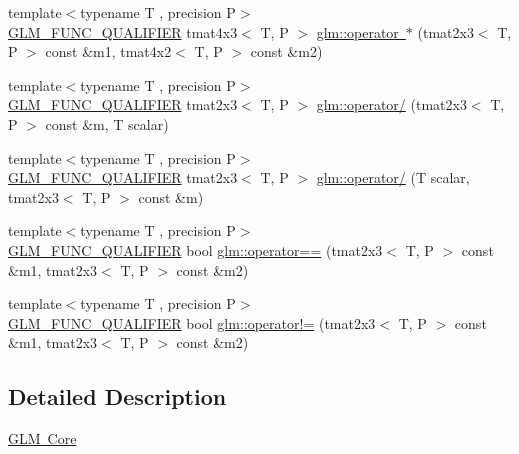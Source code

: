 \begin{DoxyCompactItemize}
\item 
{\footnotesize template$<$typename T , precision P$>$ }\\\mbox{\hyperlink{setup_8hpp_a33fdea6f91c5f834105f7415e2a64407}{G\+L\+M\+\_\+\+F\+U\+N\+C\+\_\+\+Q\+U\+A\+L\+I\+F\+I\+ER}} tmat4x3$<$ T, P $>$ \mbox{\hyperlink{namespaceglm_aaf7d0f92d8468f47eb9362cda2b3ee4c}{glm\+::operator $\ast$}} (tmat2x3$<$ T, P $>$ const \&m1, tmat4x2$<$ T, P $>$ const \&m2)
\item 
{\footnotesize template$<$typename T , precision P$>$ }\\\mbox{\hyperlink{setup_8hpp_a33fdea6f91c5f834105f7415e2a64407}{G\+L\+M\+\_\+\+F\+U\+N\+C\+\_\+\+Q\+U\+A\+L\+I\+F\+I\+ER}} tmat2x3$<$ T, P $>$ \mbox{\hyperlink{namespaceglm_ad78a0fb46bc094b31d0ee144a9316830}{glm\+::operator/}} (tmat2x3$<$ T, P $>$ const \&m, T scalar)
\item 
{\footnotesize template$<$typename T , precision P$>$ }\\\mbox{\hyperlink{setup_8hpp_a33fdea6f91c5f834105f7415e2a64407}{G\+L\+M\+\_\+\+F\+U\+N\+C\+\_\+\+Q\+U\+A\+L\+I\+F\+I\+ER}} tmat2x3$<$ T, P $>$ \mbox{\hyperlink{namespaceglm_ae913d17dd2dd1f90234509c4384a7790}{glm\+::operator/}} (T scalar, tmat2x3$<$ T, P $>$ const \&m)
\item 
{\footnotesize template$<$typename T , precision P$>$ }\\\mbox{\hyperlink{setup_8hpp_a33fdea6f91c5f834105f7415e2a64407}{G\+L\+M\+\_\+\+F\+U\+N\+C\+\_\+\+Q\+U\+A\+L\+I\+F\+I\+ER}} bool \mbox{\hyperlink{namespaceglm_ac912517a461de497022d75ec4de3dba5}{glm\+::operator==}} (tmat2x3$<$ T, P $>$ const \&m1, tmat2x3$<$ T, P $>$ const \&m2)
\item 
{\footnotesize template$<$typename T , precision P$>$ }\\\mbox{\hyperlink{setup_8hpp_a33fdea6f91c5f834105f7415e2a64407}{G\+L\+M\+\_\+\+F\+U\+N\+C\+\_\+\+Q\+U\+A\+L\+I\+F\+I\+ER}} bool \mbox{\hyperlink{namespaceglm_aa83d47e20bf01d8d4009de4d5440c457}{glm\+::operator!=}} (tmat2x3$<$ T, P $>$ const \&m1, tmat2x3$<$ T, P $>$ const \&m2)
\end{DoxyCompactItemize}


\subsection{Detailed Description}
\mbox{\hyperlink{group__core}{G\+LM Core}} 